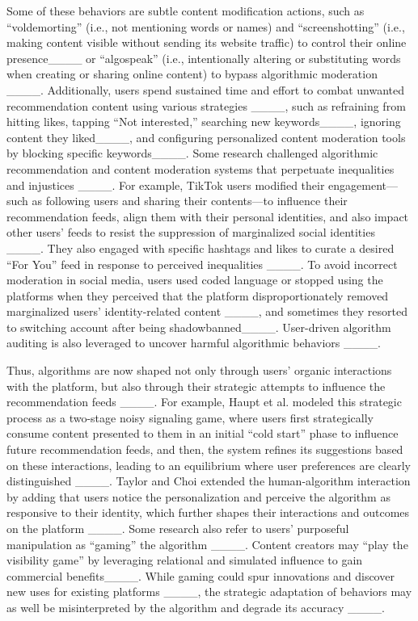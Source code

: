 Some of these behaviors are subtle content modification actions, such as ``voldemorting'' (i.e., not mentioning words or names) and ``screenshotting'' (i.e., making content visible without sending its website traffic) to control their online presence____ or ``algospeak'' (i.e., intentionally altering or substituting words when creating or sharing online content) to bypass algorithmic moderation ____. Additionally, users spend sustained time and effort to combat unwanted recommendation content using various strategies ____, such as refraining from hitting likes, tapping ``Not interested,'' searching new keywords____, ignoring content they liked____, and configuring personalized content moderation tools by blocking specific keywords____. Some research challenged algorithmic recommendation and content moderation systems that perpetuate inequalities and injustices ____. For example, TikTok users modified their engagement---such as following users and sharing their contents---to influence their recommendation feeds, align them with their personal identities, and also impact other users’ feeds to resist the suppression of marginalized social identities ____. They also engaged with specific hashtags and likes to curate a desired ``For You'' feed in response to perceived inequalities ____. To avoid incorrect moderation in social media, users used coded language or stopped using the platforms when they perceived that the platform disproportionately removed
marginalized users’ identity-related content ____, and sometimes they resorted to switching account after being shadowbanned____. User-driven algorithm auditing is also leveraged to uncover harmful algorithmic behaviors ____. 

Thus, algorithms are now shaped not only through users’ organic interactions with the platform, but also through their strategic attempts to influence the recommendation feeds ____. For example, Haupt et al. modeled this strategic process as a two-stage noisy signaling game, where users first strategically consume content presented to them in an initial ``cold start'' phase to influence future recommendation feeds, and then, the system refines its suggestions based on these interactions, leading to an equilibrium where user preferences are clearly distinguished ____. Taylor and Choi extended the human-algorithm interaction by adding that users notice the personalization and perceive the algorithm as responsive to their identity, which further shapes their interactions and outcomes on the platform ____. Some research also refer to users' purposeful manipulation as ``gaming'' the algorithm ____. Content creators may ``play the visibility game'' by leveraging relational and simulated influence to gain commercial benefits____. While gaming could spur innovations and discover new uses for existing platforms ____, the strategic adaptation of behaviors may as well be misinterpreted by the algorithm and degrade its accuracy ____.

